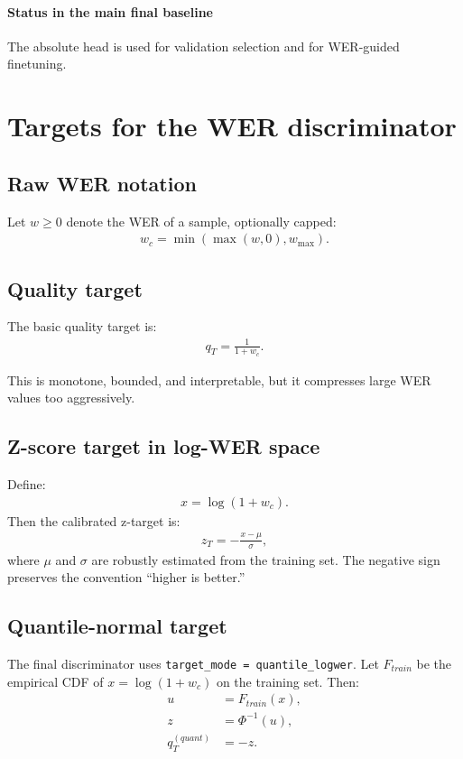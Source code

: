 \documentclass[11pt]{article}
\begin{document}
\paragraph{Status in the main final baseline}
The absolute head is used for validation selection and for WER-guided finetuning.

\section{Targets for the WER discriminator}

\subsection{Raw WER notation}
Let $w \ge 0$ denote the WER of a sample, optionally capped:
\begin{align}
    w_c = \min(\max(w, 0), w_{\max}).
\end{align}

\subsection{Quality target}
The basic quality target is:
\begin{align}
    q_T = \frac{1}{1 + w_c}.
\end{align}

This is monotone, bounded, and interpretable, but it compresses large WER values too aggressively.

\subsection{Z-score target in log-WER space}
Define:
\begin{align}
    x = \log(1 + w_c).
\end{align}
Then the calibrated z-target is:
\begin{align}
    z_T = -\frac{x - \mu}{\sigma},
\end{align}
where $\mu$ and $\sigma$ are robustly estimated from the training set. The negative sign preserves the convention ``higher is better.''

\subsection{Quantile-normal target}
The final discriminator uses \texttt{target\_mode = quantile\_logwer}. Let $F_{train}$ be the empirical CDF of $x = \log(1+w_c)$ on the training set. Then:
\begin{align}
    u &= F_{train}(x), \\
    z &= \Phi^{-1}(u), \\
    q_T^{(quant)} &= -z.
\end{align}
\end{document}

